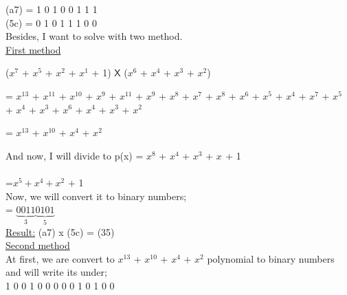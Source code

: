 \documentclass[11pt]{article}
\begin{document}
(a7) = 1 0 1 0 0 1 1 1\\

(5c) = 0 1 0 1 1 1 0 0\\

Besides, I want to solve with two method.\\

\underline{First method}\\

\begin{center}
  ($x^{7}$ + $x^{5}$ + $x^{2}$ + $x^{1}$ + 1) $\mathsf{X}$ ($x^{6}$ + $x^{4}$ + $x^{3}$ + $x^{2}$)\\
\end{center}

\begin{center}
  = $x^{13}$ + $x^{11}$ + $x^{10}$ + $x^{9}$ + $x^{11}$ + $x^{9}$ + $x^{8}$ + $x^{7}$ + $x^{8}$ + $x^{6}$ + $x^{5}$ + $x^{4}$ +
  $x^{7}$ + $x^{5}$ + $x^{4}$ + $x^{3}$ + $x^{6}$ + $x^{4}$ + $x^{3}$ + $x^{2}$\\ 
\end{center}

\begin{center}
  = $x^{13}$ + $x^{10}$ + $x^{4}$ + $x^{2}$\\
\end{center}

And now, I will divide to p(x) = $x^{8}$ + $x^{4}$ + $x^{3}$ + $x^{}$ + 1\\

\\

=$x^{5} + x^{4} + x^{2}$ + 1\\

Now, we will convert it to binary numbers;\\

= $\underbrace{0 0 1 1}_\text{3}$$\underbrace{0 1 0 1}_\text{5}$\\

\underline{Result:} (a7) x (5c) = (35)\\ 

\underline{Second method}\\

At first, we are convert to $x^{13}$ + $x^{10}$ + $x^{4}$ + $x^{2}$ polynomial to binary numbers and will write its under;\\

1 0 0 1 0 0 0 0 0 1 0 1 0 0 \\
\end{document}
